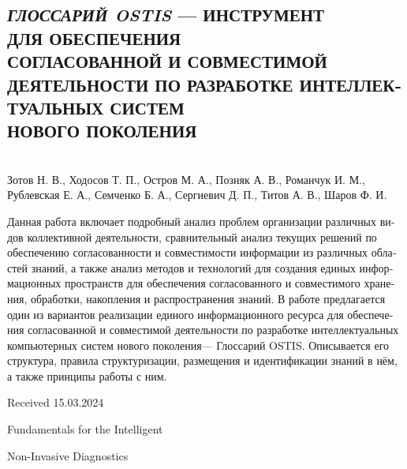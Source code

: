 \documentclass[a4paper]{article}
\begin{document}
\begin{multicols}{2}
\begin{otherlanguage}{russian}
\begin{center}
\section*{\normalsize{\textbf{\textit{ГЛОССАРИЙ OSTIS} — ИНСТРУМЕНТ
\\ ДЛЯ ОБЕСПЕЧЕНИЯ
\\ СОГЛАСОВАННОЙ И СОВМЕСТИМОЙ
\\ ДЕЯТЕЛЬНОСТИ ПО РАЗРАБОТКЕ
ИНТЕЛЛЕКТУАЛЬНЫХ СИСТЕМ
\\ НОВОГО ПОКОЛЕНИЯ}}}
\fontsize{11}{15}\selectfont
\\
Зотов Н. В., Ходосов Т. П., Остров М. А.,
Позняк А. В., Романчук И. М.,
\\
Рублевская Е. А., Семченко Б. А.,
Сергиевич Д. П., Титов А. В., Шаров Ф. И.
\end{center}
\fontsize{10}{10}\selectfont
\par Данная работа включает подробный анализ проблем
организации различных видов коллективной деятельности,
сравнительный анализ текущих решений по обеспечению
согласованности и совместимости информации из различных
областей знаний, а также анализ методов и технологий
для создания единых информационных пространств для
обеспечения согласованного и совместимого хранения, обработки, накопления и распространения знаний. В работе
предлагается один из вариантов реализации единого информационного ресурса для обеспечения согласованной и
совместимой деятельности по разработке интеллектуальных
компьютерных систем нового поколения— Глоссарий OSTIS.
Описывается его структура, правила структуризации, размещения и идентификации знаний в нём, а также принципы
работы с ним.
\end{otherlanguage}

\begin{flushright} 
Received 15.03.2024
\end{flushright}
\clearpage
\end{multicols}
\begin{center}
\fontsize{22}{30}\selectfont
Fundamentals for the Intelligent\par
Non-Invasive Diagnostics
\end{center}
\end{document}
